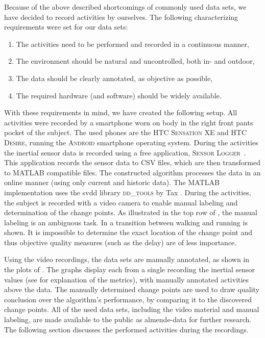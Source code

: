Because of the above described shortcomings of commonly used data sets, we have decided to record activities by ourselves.
The following characterizing requirements were set for our data sets:
\begin{enumerate}
  \item The activities need to be performed and recorded in a continuous manner,
  \item The environment should be natural and uncontrolled, both in- and outdoor,
  \item The data should be clearly annotated, as objective as possible,
  \item The required hardware (and software) should be widely available.
\end{enumerate}

With these requirements in mind, we have created the following setup.
All activities were recorded by a smartphone worn on body in the right front pants pocket of the subject.
The used phones are the \textsc{HTC Sensation XE} and \textsc{HTC Desire}, running the \textsc{Android} smartphone operating system.
During the activities the inertial sensor data is recorded using a free application, \textsc{Sensor Logger}~\cite{sensorlogger}.
This application records the sensor data to \textsc{CSV} files, which are then transformed to \textsc{MATLAB} compatible files.
The constructed algorithm processes the data in an online manner (using only current and historic data).
The \textsc{MATLAB} implementation uses the \gls{svdd} library \textsc{dd\_tools} by Tax \cite{Ddtools2013}.
During the activities, the subject is recorded with a video camera to enable manual labeling and determination of the change points.
As illustrated in the top row of , the manual labeling is an ambiguous task.
In  a transition between walking and running is shown.
It is impossible to determine the exact location of the change point and thus objective quality measures (such as the delay) are of less importance.

Using the video recordings, the data sets are manually annotated, as shown in the plots of .
The graphs display each from a single recording the inertial sensor values (see  for explanation of the metrics), with manually annotated activities above the data.
The manually determined change points are used to draw quality conclusion over the algorithm's performance, by comparing it to the discovered change points.
All of the used data sets, including the video material and manual labeling, are made available to the public as \gls{almende-data} \cite{vlasveld2014acras} for further research.
The following section discusses the performed activities during the recordings.
